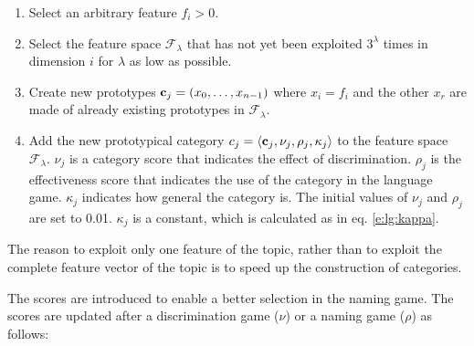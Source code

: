 \begin{enumerate}

\item Select an arbitrary feature $f_i>0$.

\item Select the feature space ${\mathcal F}_\lambda$ that has not yet been exploited $3^\lambda$ times in dimension $i$ for $\lambda$ as low as possible.

\item Create new prototypes ${\bf c}_j = (x_0,\ldots,x_{n-1})$ where $x_i=f_i$ and the other $x_r$ are made of already existing prototypes in ${\mathcal F}_\lambda$.

\item Add the new prototypical category $c_j=\langle {\bf c}_j,\nu_j,\rho_j,\kappa_j \rangle$ to the feature space ${\mathcal F}_\lambda$. $\nu_j$ is a category score that indicates the effect of discrimination. $\rho_j$ is the effectiveness score that indicates the use of the category in the language game. $\kappa_j$ indicates how general the category is. The initial values of $\nu_j$ and $\rho_j$ are set to 0.01. $\kappa_j$ is a constant, which is calculated as in eq. \ref{e:lg:kappa}. 

\end{enumerate}


The reason to exploit only one feature of the topic, rather than to exploit the complete feature vector of the topic is to speed up the construction of categories. 

The scores are introduced to enable a better selection in the naming game. The scores are updated after a discrimination game ($\nu$) or a naming game ($\rho$) as follows:


